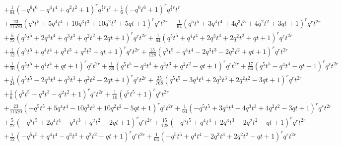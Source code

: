 \documentclass[11pt,english]{amsart}
\numberwithin{equation}{section}
\numberwithin{figure}{section}
\theoremstyle{plain}
\theoremstyle{plain}
\theoremstyle{definition}
\theoremstyle{remark}
\begin{document}
{\begin{align*}
& + \frac{1}{64} {\left(-q^{6} t^{6} - q^{4} t^{4} + q^{2} t^{2} + 1\right)}^{r} q^{\frac{1}{2} r}t^{r} + \frac{1}{6} {\left(-q^{6} t^{6} + 1\right)}^{r} q^{\frac{1}{2} r}t^{r} \\
& + \frac{23}{11520} {\left(q^{5} t^{5} + 5 q^{4} t^{4} + 10 q^{3} t^{3} + 10 q^{2} t^{2} + 5 q t + 1\right)}^{r} q^{r}t^{2r} + \frac{1}{64} {\left(q^{5} t^{5} + 3 q^{4} t^{4} + 4 q^{3} t^{3} + 4 q^{2} t^{2} + 3 q t + 1\right)}^{r} q^{r}t^{2r} \\
& + \frac{5}{72} {\left(q^{5} t^{5} + 2 q^{4} t^{4} + q^{3} t^{3} + q^{2} t^{2} + 2 q t + 1\right)}^{r} q^{r}t^{2r} + \frac{1}{64} {\left(q^{5} t^{5} + q^{4} t^{4} + 2 q^{3} t^{3} + 2 q^{2} t^{2} + q t + 1\right)}^{r} q^{r}t^{2r} \\
& + \frac{1}{12} {\left(q^{5} t^{5} + q^{4} t^{4} + q^{3} t^{3} + q^{2} t^{2} + q t + 1\right)}^{r} q^{r}t^{2r} + \frac{15}{128} {\left(q^{5} t^{5} + q^{4} t^{4} - 2 q^{3} t^{3} - 2 q^{2} t^{2} + q t + 1\right)}^{r} q^{r}t^{2r} \\
& + \frac{1}{16} {\left(q^{5} t^{5} + q^{4} t^{4} + q t + 1\right)}^{r} q^{r}t^{2r} + \frac{1}{36} {\left(q^{5} t^{5} - q^{4} t^{4} + q^{3} t^{3} + q^{2} t^{2} - q t + 1\right)}^{r} q^{r}t^{2r} + \frac{17}{64} {\left(q^{5} t^{5} - q^{4} t^{4} - q t + 1\right)}^{r} q^{r}t^{2r} \\
& + \frac{1}{24} {\left(q^{5} t^{5} - 2 q^{4} t^{4} + q^{3} t^{3} + q^{2} t^{2} - 2 q t + 1\right)}^{r} q^{r}t^{2r} + \frac{25}{768} {\left(q^{5} t^{5} - 3 q^{4} t^{4} + 2 q^{3} t^{3} + 2 q^{2} t^{2} - 3 q t + 1\right)}^{r} q^{r}t^{2r} \\
& + \frac{1}{6} {\left(q^{5} t^{5} - q^{3} t^{3} - q^{2} t^{2} + 1\right)}^{r} q^{r}t^{2r} + \frac{1}{10} {\left(q^{5} t^{5} + 1\right)}^{r} q^{r}t^{2r} \\
& + \frac{23}{11520} {\left(-q^{5} t^{5} + 5 q^{4} t^{4} - 10 q^{3} t^{3} + 10 q^{2} t^{2} - 5 q t + 1\right)}^{r} q^{r}t^{2r} + \frac{1}{64} {\left(-q^{5} t^{5} + 3 q^{4} t^{4} - 4 q^{3} t^{3} + 4 q^{2} t^{2} - 3 q t + 1\right)}^{r} q^{r}t^{2r} \\
& + \frac{5}{72} {\left(-q^{5} t^{5} + 2 q^{4} t^{4} - q^{3} t^{3} + q^{2} t^{2} - 2 q t + 1\right)}^{r} q^{r}t^{2r} + \frac{15}{128} {\left(-q^{5} t^{5} + q^{4} t^{4} + 2 q^{3} t^{3} - 2 q^{2} t^{2} - q t + 1\right)}^{r} q^{r}t^{2r} \\
& + \frac{1}{12} {\left(-q^{5} t^{5} + q^{4} t^{4} - q^{3} t^{3} + q^{2} t^{2} - q t + 1\right)}^{r} q^{r}t^{2r} + \frac{1}{64} {\left(-q^{5} t^{5} + q^{4} t^{4} - 2 q^{3} t^{3} + 2 q^{2} t^{2} - q t + 1\right)}^{r} q^{r}t^{2r} \\

\end{align*}}
\end{document}
